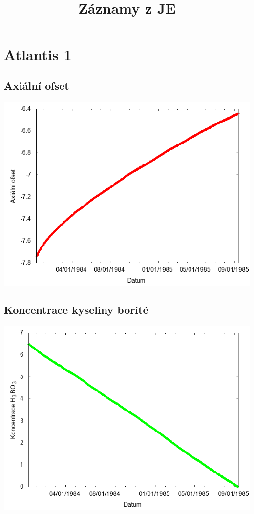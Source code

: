 \documentclass[a4paper,twoside,11pt]{article}
\begin{document}
      \title{Záznamy z JE}
      \date{}
      \maketitle
      \tableofcontents
      \newpage
    
\section*{Atlantis 1}
\subsection*{Axiální ofset}
\begin{center}
\includegraphics[width=.8\textwidth]{graphs/Atlantis_01_ao.png}
\end{center}

\subsection*{Koncentrace kyseliny borité}
\begin{center}
\includegraphics[width=.8\textwidth]{graphs/Atlantis_01_bc.png}
\end{center}
\end{document}
